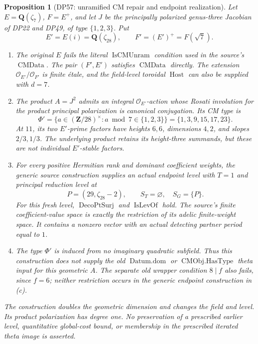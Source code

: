 \documentclass[11pt,a4paper]{article}
\newtheorem{proposition}[theorem]{Proposition}
\theoremstyle{definition}\newtheorem{remark}[theorem]{Remark}
\begin{document}
\begin{proposition}[DP57: unramified CM repair and endpoint realization]\label{DP57}
Let $E=\mathbf Q(\zeta _7)$, $F=E^+$, and let $J$ be the principally
polarized genus-three Jacobian of DP22 and DP49, of type $\{1,2,3\}$.
Put
\[
 E'=E(i)=\mathbf Q(\zeta _{28}),\qquad F'=(E')^+=F(\sqrt7).
\]
\begin{enumerate}[label=(\alph*),leftmargin=*]
\item The original $E$ fails the literal $\operatorname{IsCMUnram}$
condition used in the source's $\operatorname{CMData}$.
The pair $(F',E')$ satisfies $\operatorname{CMData}$ directly.
The extension $\mathcal O_{E'}/\mathcal O_{F'}$ is finite
\emph{étale}, and the field-level toroidal $\operatorname{Host}$
can also be supplied with $d=7$.
\item The product $A=J^2$ admits an integral $\mathcal O_{E'}$-action
whose Rosati involution for the product principal polarization is
canonical conjugation. Its CM type is
\[
 \Phi'=\{a\in(\mathbf Z/28)^\times:a\bmod7\in\{1,2,3\}\}
      =\{1,3,9,15,17,23\}.
\]
At $11$, its two $E'$-prime factors have heights $6,6$,
dimensions $4,2$, and slopes $2/3,1/3$.
The underlying product retains its height-three summands, but these
are not individual $E'$-stable factors.
\item For every positive Hermitian rank and dominant coefficient
weights, the generic source construction supplies an actual endpoint
level with $T=1$ and principal reduction level at
\[
 P=(29,\zeta _{28}-2),\qquad
 S_T=\varnothing,\quad S_G=\{P\}.
\]
For this fresh level, $\operatorname{DecoPtSurj}$ and
$\operatorname{IsLevOf}$ hold.
The source's finite coefficient-value space is exactly the restriction
of its adelic finite-weight space. It contains a nonzero vector with
an actual detecting partner period equal to $1$.
\item The type $\Phi'$ is induced from no imaginary quadratic
subfield. Thus this construction does not supply the old
$\operatorname{Datum.dom}$ or $\operatorname{CMObj.HasType}$
theta input for this geometric $A$.
The separate old wrapper condition $8\mid f$ also fails, since $f=6$;
neither restriction occurs in the generic endpoint construction in (c).
\end{enumerate}
The construction doubles the geometric dimension and changes the field
and level. Its product polarization has degree one.
No preservation of a prescribed earlier level, quantitative global-cost
bound, or membership in the prescribed iterated theta image is asserted.
\end{proposition}
\end{document}
